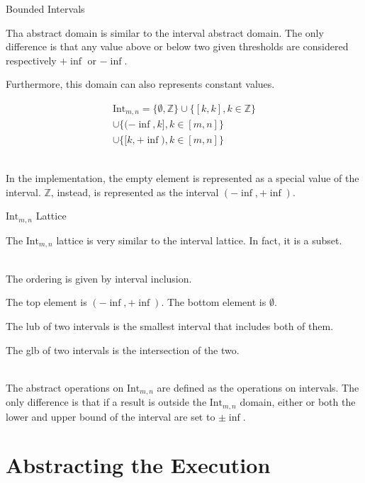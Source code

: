 \documentclass{beamer}
\begin{document}
\begin{frame}{Bounded Intervals}

    Tha abstract domain is similar to the interval abstract domain.
    The only difference is that any value above or below two given thresholds are considered respectively $+\inf$ or $-\inf$.

    Furthermore, this domain can also represents constant values.

    \begin{multline*}
        \textrm{Int}_{m,n} = \{ \emptyset, \mathbb{Z} \}
        \cup \{ [k, k], k \in \mathbb{Z} \} \\
        \cup \{ (-\inf, k], k \in [m, n] \} \\
        \cup \{ [k, +\inf), k \in [m, n] \}
    \end{multline*}

    ~\\
    In the implementation, the empty element is represented as a special value of the interval.
    $\mathbb{Z}$, instead, is represented as the interval $(-\inf, +\inf)$.

\end{frame}

\begin{frame}{$\textrm{Int}_{m,n}$ Lattice}

    The $\textrm{Int}_{m,n}$ lattice is very similar to the interval lattice.
    In fact, it is a subset.

    ~\\

    The ordering is given by interval inclusion.

    The top element is $(-\inf, +\inf)$.
    The bottom element is $\emptyset$.

    The lub of two intervals is the smallest interval that includes both of them.

    The glb of two intervals is the intersection of the two.

    ~\\

    The abstract operations on $\textrm{Int}_{m,n}$ are defined as the operations on intervals.
    The only difference is that if a result is outside the $\textrm{Int}_{m,n}$ domain, either or both the lower and upper bound of the interval are set to $\pm \inf$.

\end{frame}

\section{Abstracting the Execution}
\end{document}

